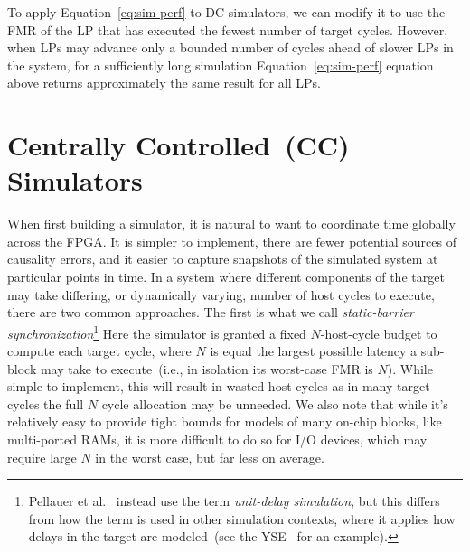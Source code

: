 To apply Equation~\ref{eq:sim-perf} to DC simulators, we can modify it to use
the FMR of the LP that has executed the fewest number of target cycles.
However, when LPs may advance only a bounded number of cycles
ahead of slower LPs in the system, for a sufficiently long simulation Equation~\ref{eq:sim-perf}
equation above returns approximately the same result for all LPs.

\section{Centrally Controlled~(CC) Simulators}

When first building a simulator, it is natural to want to coordinate time
globally across the FPGA. It is simpler to implement, there are fewer potential
sources of causality errors, and it easier to capture snapshots of the simulated system at particular points in
time. In a system where different components of the target may take differing,
or dynamically varying, number of host cycles to execute, there are two
common approaches.  The first is what we call \emph{static-barrier synchronization}\footnote{Pellauer et al.~\cite{APortNetworks}
instead use the term \emph{unit-delay simulation}, but this differs from how the term is used in other simulation contexts, where
it applies how delays in the target are modeled~(see the YSE~\cite{YSEHardware} for an example).}
Here the simulator is granted a fixed $N$-host-cycle budget to
compute each target cycle, where $N$ is equal the largest possible
latency a sub-block may take to execute~(i.e., in isolation its worst-case FMR is $N$). While simple to
implement, this will result in wasted host cycles as in many target cycles the
full $N$ cycle allocation may be unneeded.  We also note that while it's
relatively easy to provide tight bounds for models of many on-chip
blocks, like multi-ported RAMs, it is more difficult to do so for I/O devices, which may require large $N$
in the worst case, but far less on average.

